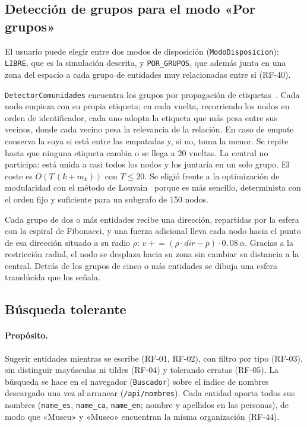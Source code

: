 \subsection{Detección de grupos para el modo «Por grupos»}
\label{sec:alg-grupos}

El usuario puede elegir entre dos modos de disposición (\texttt{ModoDisposicion}): \texttt{LIBRE}, que es la simulación descrita, y \texttt{POR\_GRUPOS}, que además junta en una zona del espacio a cada grupo de entidades muy relacionadas entre sí (RF-40).

\texttt{DetectorComunidades} encuentra los grupos por propagación de etiquetas~\cite{raghavan2007}. Cada nodo empieza con su propia etiqueta; en cada vuelta, recorriendo los nodos en orden de identificador, cada uno adopta la etiqueta que más pesa entre sus vecinos, donde cada vecino pesa la relevancia de la relación. En caso de empate conserva la suya si está entre las empatadas y, si no, toma la menor. Se repite hasta que ninguna etiqueta cambia o se llega a 20 vueltas. La central no participa: está unida a casi todos los nodos y los juntaría en un solo grupo. El coste es $O(T\,(k+m_k))$ con $T\le20$. Se eligió frente a la optimización de modularidad con el método de Louvain~\cite{blondel2008} porque es más sencillo, determinista con el orden fijo y suficiente para un subgrafo de 150 nodos.

Cada grupo de dos o más entidades recibe una dirección, repartidas por la esfera con la espiral de Fibonacci, y una fuerza adicional lleva cada nodo hacia el punto de esa dirección situado a su radio $\rho$: $v \mathrel{+}= (\rho\cdot dir - p)\cdot0{,}08\,\alpha$. Gracias a la restricción radial, el nodo se desplaza hacia su zona sin cambiar su distancia a la central. Detrás de los grupos de cinco o más entidades se dibuja una esfera translúcida que los señala.

\subsection{Búsqueda tolerante}
\label{sec:alg-busqueda}

\paragraph{Propósito.} Sugerir entidades mientras se escribe (RF-01, RF-02), con filtro por tipo (RF-03), sin distinguir mayúsculas ni tildes (RF-04) y tolerando erratas (RF-05). La búsqueda se hace en el navegador (\texttt{Buscador}) sobre el índice de nombres descargado una vez al arrancar (\texttt{/api/nombres}). Cada entidad aporta todos sus nombres (\texttt{name\_es}, \texttt{name\_ca}, \texttt{name\_en}; nombre y apellidos en las personas), de modo que «Museu» y «Museo» encuentran la misma organización (RF-44).

